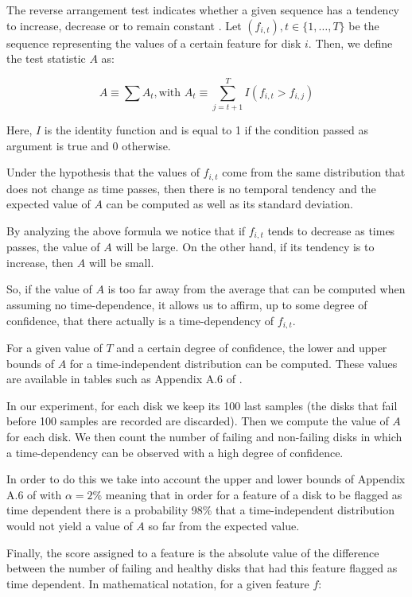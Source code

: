 The reverse arrangement test indicates whether a given sequence has a tendency to increase, decrease or to remain constant \cite{Murray2005}.
Let $(f_{i,t}), t \in \{1,\dots,T\}$ be the sequence representing the values of a certain feature for disk $i$.
Then, we define the test statistic $A$ as:

\begin{equation}\label{eq:reverse_arrangement}
  A \equiv \sum A_t, \text{with } A_t \equiv \sum_{j=t+1}^{T} I(f_{i, t} > f_{i, j})
\end{equation}

Here, $I$ is the identity function and is equal to 1 if the condition passed as argument is true and 0 otherwise.

Under the hypothesis that the values of $f_{i,t}$ come from the same distribution that does not change as time passes, then there is no temporal tendency and the expected value of $A$ can be computed as well as its standard deviation.

By analyzing the above formula we notice that if $f_{i,t}$ tends to decrease as times passes, the value of $A$ will be large.
On the other hand, if its tendency is to increase, then $A$ will be small.

So, if the value of $A$ is too far away from the average that can be computed when assuming no time-dependence, it allows us to affirm, up to some degree of confidence, that there actually is a time-dependency of $f_{i,t}$.

For a given value of $T$ and a certain degree of confidence, the lower and upper bounds of $A$ for a time-independent distribution can be computed.
These values are available in tables such as Appendix A.6 of \cite{bendat2011random}.

In our experiment, for each disk we keep its 100 last samples (the disks that fail before 100 samples are recorded are discarded).
Then we compute the value of $A$ for each disk.
We then count the number of failing and non-failing disks in which a time-dependency can be observed with a high degree of confidence.

In order to do this we take into account the upper and lower bounds of Appendix A.6 of \cite{bendat2011random} with $\alpha = 2\%$ meaning that in order for a feature of a disk to be flagged as time dependent there is a probability 98\% that a time-independent distribution would not yield a value of $A$ so far from the expected value.

Finally, the score assigned to a feature is the absolute value of the difference between the number of failing and healthy disks that had this feature flagged as time dependent.
In mathematical notation, for a given feature $f$:

